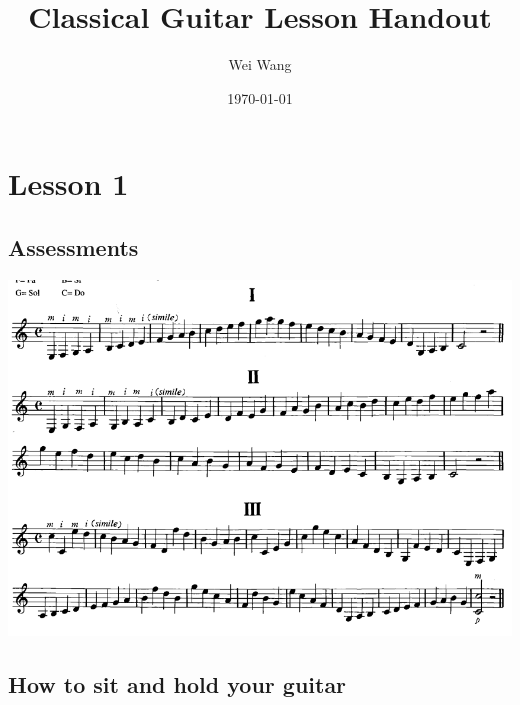 \documentclass[11pt]{article}
\author{Wei Wang}
\date{\today}
\title{Classical Guitar Lesson Handout}
\begin{document}
\maketitle
\section*{Lesson 1}
\label{sec:org4a9f57e}
\subsection*{Assessments}
\label{sec:org014ff87}
\begin{center}
\includegraphics[width=.9\linewidth]{./Handouts.org_20240214_221205.png}
\end{center}
\subsection*{How to sit and hold your guitar}
\label{sec:orgb180b29}
\end{document}
